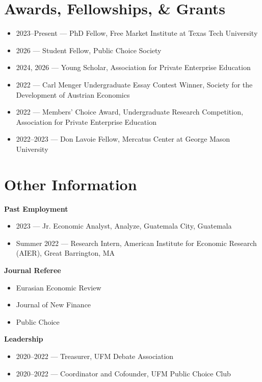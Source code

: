\documentclass[11pt]{article}
\begin{document}
\section*{Awards, Fellowships, \& Grants}

\begin{itemize}
    \item 2023--Present --- PhD Fellow, Free Market Institute at Texas Tech University
    \item 2026 --- Student Fellow, Public Choice Society
    \item 2024, 2026 --- Young Scholar, Association for Private Enterprise Education
    \item 2022 --- Carl Menger Undergraduate Essay Contest Winner, Society for the Development of Austrian Economics
    \item 2022 --- Members’ Choice Award, Undergraduate Research Competition, Association for Private Enterprise Education
    \item 2022--2023 --- Don Lavoie Fellow, Mercatus Center at George Mason University
\end{itemize}

\section*{Other Information}

\textbf{Past Employment}

\begin{itemize}
    \item 2023 --- Jr. Economic Analyst, Analyze, Guatemala City, Guatemala
    \item Summer 2022 --- Research Intern, American Institute for Economic Research (AIER), Great Barrington, MA
\end{itemize}

\textbf{Journal Referee}

\begin{itemize}
    \item Eurasian Economic Review
    \item Journal of New Finance
    \item Public Choice
\end{itemize}

\textbf{Leadership}

\begin{itemize}
    \item 2020--2022 --- Treasurer, UFM Debate Association
    \item 2020--2022 --- Coordinator and Cofounder, UFM Public Choice Club
\end{itemize}
\end{document}
